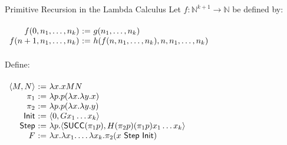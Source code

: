\documentclass{beamer}
\newcommand{\vs}{\\~\\}
\begin{document}
\begin{frame}{Primitive Recursion in the Lambda Calculus}
  Let $f:\mathbb{N}^{k+1}\to\mathbb{N}$ be defined by:
  \vs
  \begin{math}
    \begin{array}{r@{~:=~}l}
      f(0, n_1, \ldots, n_k) & g(n_1, \ldots, n_k) \\
      f(n+1, n_1, \ldots, n_k) & h(f(n, n_1, \ldots, n_k), n, n_1, \ldots, n_k)
    \end{array}
  \end{math}
  \vs
  Define:
  \vs
  \begin{math}
    \begin{array}{r@{~:=~}l}
      \langle M, N\rangle
      &
      \lambda x.x M N
      \\
      \pi_1
      &
      \lambda p.p(\lambda x.\lambda y.x)
      \\
      \pi_2
      &
      \lambda p.p(\lambda x.\lambda y.y)
      \\
      \mathsf{Init}
      &
      \langle 0,G x_1 \ldots x_k \rangle
      \\
      \mathsf{Step}
      &
      \lambda p.\langle \mathsf{SUCC}(\pi_1 p),H(\pi_2 p)(\pi_1 p)x_1\ldots x_k\rangle
      \\
      F
      &
      \lambda x.\lambda x_1.\ldots\lambda x_k.\pi_2(x~\mathsf{Step}~\mathsf{Init})
    \end{array}
  \end{math}

\end{frame}
\end{document}
